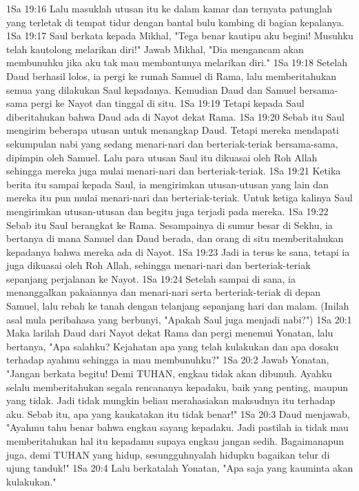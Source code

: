 1Sa 19:16  Lalu masuklah utusan itu ke dalam kamar dan ternyata patunglah yang terletak di tempat tidur dengan bantal bulu kambing di bagian kepalanya.
1Sa 19:17  Saul berkata kepada Mikhal, "Tega benar kautipu aku begini! Musuhku telah kautolong melarikan diri!" Jawab Mikhal, "Dia mengancam akan membunuhku jika aku tak mau membantunya melarikan diri."
1Sa 19:18  Setelah Daud berhasil lolos, ia pergi ke rumah Samuel di Rama, lalu memberitahukan semua yang dilakukan Saul kepadanya. Kemudian Daud dan Samuel bersama-sama pergi ke Nayot dan tinggal di situ.
1Sa 19:19  Tetapi kepada Saul diberitahukan bahwa Daud ada di Nayot dekat Rama.
1Sa 19:20  Sebab itu Saul mengirim beberapa utusan untuk menangkap Daud. Tetapi mereka mendapati sekumpulan nabi yang sedang menari-nari dan berteriak-teriak bersama-sama, dipimpin oleh Samuel. Lalu para utusan Saul itu dikuasai oleh Roh Allah sehingga mereka juga mulai menari-nari dan berteriak-teriak.
1Sa 19:21  Ketika berita itu sampai kepada Saul, ia mengirimkan utusan-utusan yang lain dan mereka itu pun mulai menari-nari dan berteriak-teriak. Untuk ketiga kalinya Saul mengirimkan utusan-utusan dan begitu juga terjadi pada mereka.
1Sa 19:22  Sebab itu Saul berangkat ke Rama. Sesampainya di sumur besar di Sekhu, ia bertanya di mana Samuel dan Daud berada, dan orang di situ memberitahukan kepadanya bahwa mereka ada di Nayot.
1Sa 19:23  Jadi ia terus ke sana, tetapi ia juga dikuasai oleh Roh Allah, sehingga menari-nari dan berteriak-teriak sepanjang perjalanan ke Nayot.
1Sa 19:24  Setelah sampai di sana, ia menanggalkan pakaiannya dan menari-nari serta berteriak-teriak di depan Samuel, lalu rebah ke tanah dengan telanjang sepanjang hari dan malam. (Inilah asal mula peribahasa yang berbunyi, "Apakah Saul juga menjadi nabi?")
1Sa 20:1  Maka larilah Daud dari Nayot dekat Rama dan pergi menemui Yonatan, lalu bertanya, "Apa salahku? Kejahatan apa yang telah kulakukan dan apa dosaku terhadap ayahmu sehingga ia mau membunuhku?"
1Sa 20:2  Jawab Yonatan, "Jangan berkata begitu! Demi TUHAN, engkau tidak akan dibunuh. Ayahku selalu memberitahukan segala rencananya kepadaku, baik yang penting, maupun yang tidak. Jadi tidak mungkin beliau merahasiakan maksudnya itu terhadap aku. Sebab itu, apa yang kaukatakan itu tidak benar!"
1Sa 20:3  Daud menjawab, "Ayahmu tahu benar bahwa engkau sayang kepadaku. Jadi pastilah ia tidak mau memberitahukan hal itu kepadamu supaya engkau jangan sedih. Bagaimanapun juga, demi TUHAN yang hidup, sesungguhnyalah hidupku bagaikan telur di ujung tanduk!"
1Sa 20:4  Lalu berkatalah Yonatan, "Apa saja yang kauminta akan kulakukan."
